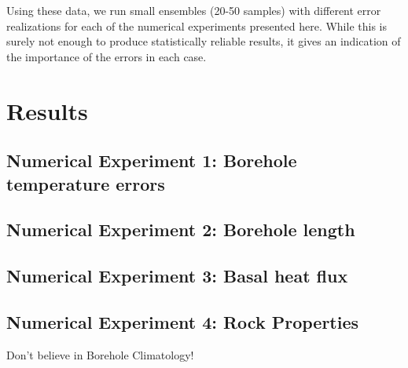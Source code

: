 \documentclass[cp]{copernicus}
\begin{document}
Using these data, we run small ensembles (20-50 samples) with different error realizations for each 
of the numerical experiments presented here. While this is surely not enough to produce 
statistically reliable results, it gives an indication of the importance of the errors in 
each case. 


\section{Results}\label{sec:results}

\subsection{Numerical Experiment 1: Borehole temperature errors}\label{sec:errors}
\subsection{Numerical Experiment 2: Borehole length}\label{sec:length}
\subsection{Numerical Experiment 3: Basal heat flux}\label{sec:qb}
\subsection{Numerical Experiment 4: Rock Properties}\label{sec:props}

\conclusions %
Don't believe in Borehole Climatology!



\end{document}
